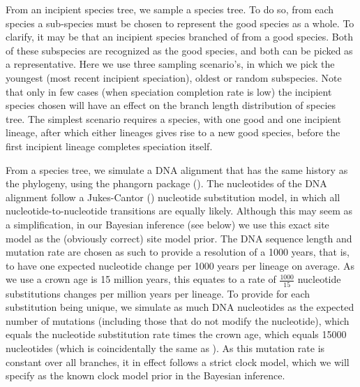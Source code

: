 \documentclass{article}
\begin{document}
From an incipient species tree, we sample a species tree. To do
so, from each species a sub-species must be chosen to represent
the good species as a whole. To clarify, it may be that an
incipient species branched of from a good species. Both of these
subspecies are recognized as the good species, and both can be 
picked as a representative. Here we use three sampling scenario's,
in which we pick the youngest (most recent incipient speciation), 
oldest or random subspecies. Note that only in few 
cases (when speciation completion rate is low) the incipient species
chosen will have an effect on the branch length distribution of species 
tree. The simplest scenario requires a species, with one good and
one incipient lineage, after which either lineages gives 
rise to a new good species, before the first incipient lineage
completes speciation itself.

From a species tree, we simulate a DNA alignment that has the same history
as the phylogeny, using the phangorn package (\cite{phangorn}). 
The nucleotides of the DNA alignment follow a Jukes-Cantor (\cite{jc69})
nucleotide substitution model, in which all nucleotide-to-nucleotide transitions
are equally likely. Although this may seem as a simplification, in our Bayesian
inference (see below) we use this exact site model as the (obviously correct) site model prior.
The DNA sequence length and mutation rate are chosen as such to provide a
resolution of a 1000 years, that is, to have one expected nucleotide change 
per 1000 years per lineage on average. As we use a crown age is 15 million years,
this equates to a rate of $\frac{1000}{15}$ nucleotide substitutions 
changes per million years per lineage. To provide for each substitution being unique,
we simulate as much DNA nucleotides as the expected number of mutations (including those
that do not modify the nucleotide), which equals the
nucleotide substitution rate times the crown age, which equals 15000 nucleotides (which is
coincidentally the same as \cite{moller2018}). As this
mutation rate is constant over all branches, it in effect follows a strict 
clock model, which we will specify as the known clock model prior in the Bayesian inference.
\end{document}
